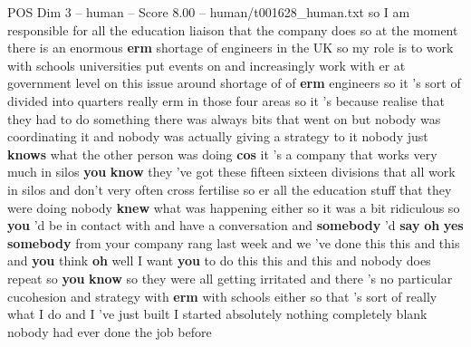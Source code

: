 \begin{textsample}{POS Dim 3 – human – Score 8.00 – human/t001628\_human.txt}  \label{ex:f3_pos_003}
so I am responsible for all the education liaison that the company does so at the moment there is an enormous \textbf{erm} shortage of engineers in the UK so my role is to work with schools universities put events on and increasingly work with er at government level on this issue around shortage of of \textbf{erm} engineers so it 's sort of divided into quarters really erm in those four areas so it 's because realise that they had to do something there was always bits that went on but nobody was coordinating it and nobody was actually giving a strategy to it nobody just \textbf{knows} what the other person was doing \textbf{cos} it 's a company that works very much in silos \textbf{you} \textbf{know} they 've got these fifteen sixteen divisions that all work in silos and don't very often cross fertilise so er all the education stuff that they were doing nobody \textbf{knew} what was happening either so it was a bit ridiculous so \textbf{you} 'd be in contact with and have a conversation and \textbf{somebody} 'd \textbf{say} \textbf{oh} \textbf{yes} \textbf{somebody} from your company rang last week and we 've done this this and this and \textbf{you} think \textbf{oh} well I want \textbf{you} to do this this and this and nobody does repeat so \textbf{you} \textbf{know} so they were all getting irritated and there 's no particular cucohesion and strategy with \textbf{erm} with schools either so that 's sort of really what I do and I 've just built I started absolutely nothing completely blank nobody had ever done the job before

\end{textsample}
